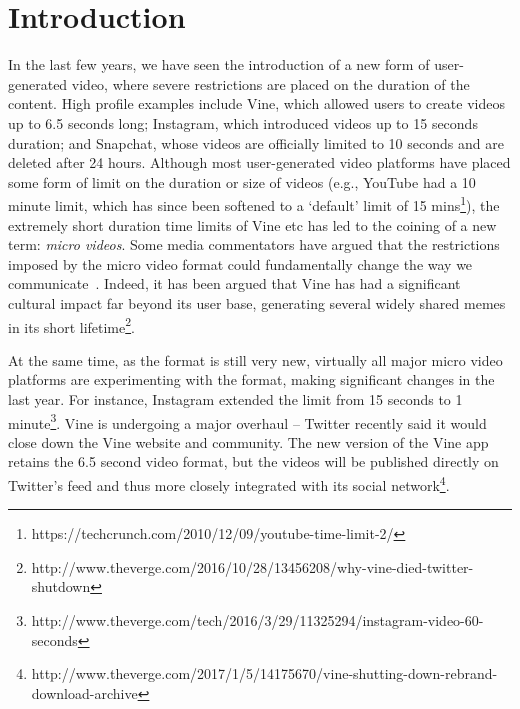 \section{Introduction}
In the last few years, we have seen the introduction of a new form of user-generated video, where severe restrictions are placed on the duration of the content. High profile examples include Vine, which allowed users to create videos up to 6.5 seconds long;  Instagram, which introduced videos up to 15 seconds duration; and Snapchat, whose videos are officially limited to 10 seconds and are deleted after 24 hours. 
Although most user-generated video platforms have placed some form of limit on the duration or size of videos (e.g., YouTube had a 10 minute limit, which has since been softened to a `default' limit of 15 mins\footnote{\scriptsize https://techcrunch.com/2010/12/09/youtube-time-limit-2/}), the extremely short duration time limits of Vine etc has led to the coining of a new term: \emph{micro videos}. Some media commentators have argued that the restrictions imposed by the micro video format could fundamentally change the way we communicate~\cite{bbc}. Indeed, it has been argued that Vine has had a significant cultural impact far beyond its user base, generating several widely shared memes in its short lifetime\footnote{\scriptsize http://www.theverge.com/2016/10/28/13456208/why-vine-died-twitter-shutdown}. 









At the same time, as the format is still very new, virtually all major micro video platforms are experimenting with the format, making significant changes in the last year. For instance, Instagram extended the limit from 15 seconds to 1 minute\footnote{\scriptsize http://www.theverge.com/tech/2016/3/29/11325294/instagram-video-60-seconds}. Vine is undergoing a major overhaul -- Twitter recently said it would close down the Vine website and community. The new version of the Vine app retains the 6.5 second video format, but the videos will be published directly on Twitter's feed and thus more closely integrated with its social network\footnote{\scriptsize http://www.theverge.com/2017/1/5/14175670/vine-shutting-down-rebrand-download-archive}. 

